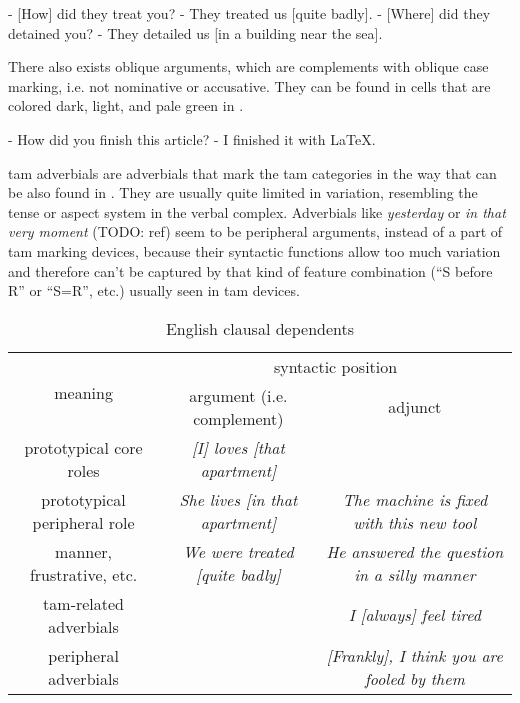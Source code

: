 \documentclass[UTF8, a4paper, oneside, scheme=plain, 12pt]{ctexbook}
\newcommand{\form}[1]{\emph{#1}}
\begin{document}
\begin{exe}
    \ex\label{ex:simple-clause.dependents.ex-1} - [How] did they treat you? - They treated us [quite badly].
    \ex\label{ex:simple-clause.dependents.ex-2} - [Where] did they detained you? - They detailed us [in a building near the sea].
\end{exe}

There also exists oblique arguments,
which are complements with oblique case marking, i.e. not nominative or accusative.
They can be found in cells that are colored dark, light, and pale green in .

\begin{exe}
    \ex\label{ex:simple-clause.dependents.ex-3} - How did you finish this article? 
    - I finished it with LaTeX.
\end{exe}

\acs{tam} adverbials are adverbials that mark the \acs{tam} categories 
in the way that can be also found in .
They are usually quite limited in variation,
resembling the tense or aspect system in the verbal complex.
Adverbials like \form{yesterday} or \form{in that very moment} (TODO: ref)
seem to be peripheral arguments, instead of a part of \acs{tam} marking devices,
because their syntactic functions allow too much variation 
and therefore can't be captured by that kind of feature combination 
(``S before R'' or ``S=R'', etc.)
usually seen in \acs{tam} devices. 


\begin{table}[H]
    \caption{English clausal dependents}
    \label{tbl:clausal-dependent}
    \centering
    {\small
    \begin{tabular}{ccc}
    \toprule
    \multirow{2}{*}{meaning}      & \multicolumn{2}{c}{syntactic position}                                                       \\ \cmidrule{2-3}
                                  & argument (i.e. complement)                             & adjunct                                             \\ \midrule
    prototypical core roles       & \cellcolor[HTML]{32CB00}\form{[I] loves [that apartment]}             & \\ 
    prototypical peripheral role  & \cellcolor[HTML]{34FF34}\form{She lives [in that apartment]} & \cellcolor[HTML]{34CDF9}\form{The machine is fixed with this new tool}    \\
    manner, frustrative, etc.     & \cellcolor[HTML]{DAE8FC}\cellcolor[HTML]{67FD9A}\form{We were treated [quite badly]} & \cellcolor[HTML]{DAE8FC}\form{He answered the question in a silly manner} \\
    \acs{tam}-related adverbials &                                        & \cellcolor[HTML]{ECF4FF}\form{I [always] feel tired}                      \\
    peripheral adverbials  &                                        & \form{[Frankly], I think you are fooled by them} \\ \bottomrule
    \end{tabular}}
\end{table}
\end{document}
